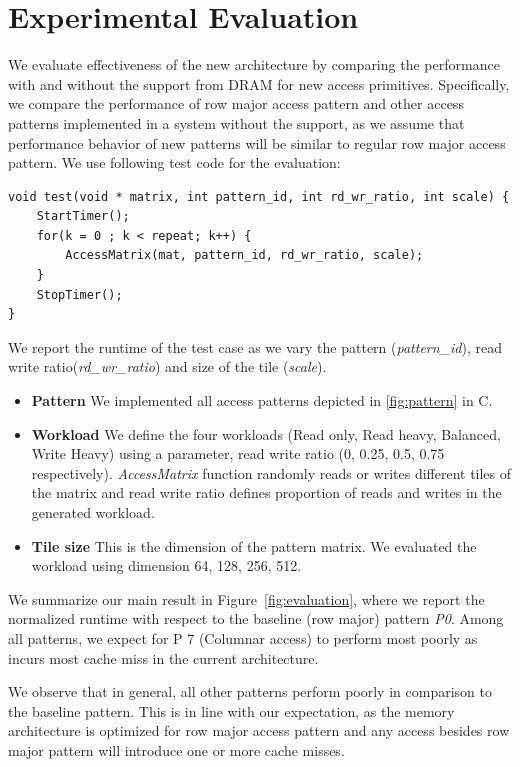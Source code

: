 \documentclass[letterpaper]{article}
\begin{document}
\section{Experimental Evaluation}

We evaluate effectiveness of the new architecture by comparing the performance with and without
the support from DRAM for new access primitives. Specifically, we compare the performance
of row major access pattern and other access patterns implemented in a system without the support,
as we assume that performance behavior of new patterns will be similar to regular row major
access pattern. We use following test code for the evaluation:

\begin{Verbatim}[fontsize=\small]
void test(void * matrix, int pattern_id, int rd_wr_ratio, int scale) {
    StartTimer();
    for(k = 0 ; k < repeat; k++) {
        AccessMatrix(mat, pattern_id, rd_wr_ratio, scale);
    }
    StopTimer();
}
\end{Verbatim}


We report the runtime of the test case as we vary the pattern
(\textit{pattern\_id}), read write ratio(\textit{rd\_wr\_ratio}) and size of the tile (\textit{scale}).

\begin{itemize}
  \item \textbf{Pattern} We implemented all access patterns depicted in \ref{fig:pattern} in C.
  \item \textbf{Workload} We define the four workloads (Read only, Read heavy,
Balanced, Write Heavy) using a parameter, read write ratio (0, 0.25, 0.5, 0.75 respectively).
\textit{AccessMatrix} function randomly reads or writes different tiles of the matrix and read
write ratio defines proportion of reads and writes in the generated workload.
  \item \textbf{Tile size} This is the dimension of the pattern matrix. We evaluated the
  workload using dimension 64, 128, 256, 512.
\end{itemize}

We summarize our main result in Figure~\ref{fig:evaluation}, where we report the normalized runtime
with respect to the baseline (row major) pattern \textit{P0}. Among all patterns, we expect for P 7 (Columnar access) to perform most poorly as incurs most cache miss in the current architecture. 

 We observe that in general, all other patterns
perform poorly in comparison to the baseline pattern. This is in line with our expectation, 
as the memory architecture is optimized for row major access pattern and any access besides row major pattern will introduce one or more cache misses. 
\end{document}
